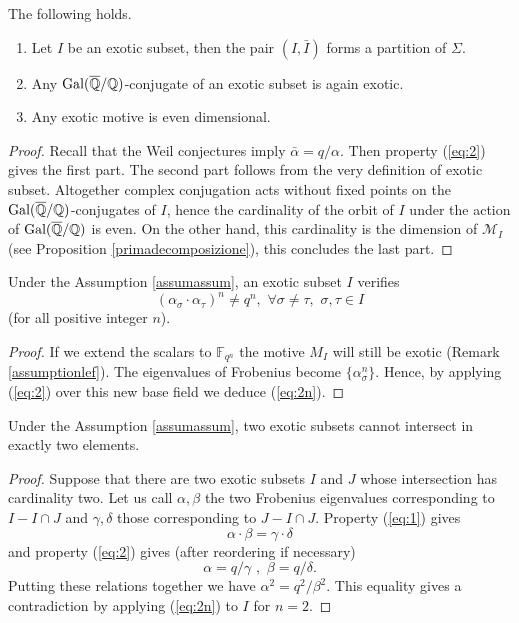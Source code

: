 \documentclass[11pt]{amsart}
\begin{document}
\begin{lemma}\label{lemmaeven} The following holds.
\begin{enumerate}
\item\label{partizione} Let $I$ be an exotic subset, then the pair $(I,\bar{I})$ forms a partition of $\Sigma$.
\item Any  $\textnormal{Gal}(\overline{\mathbb{Q}}/\mathbb{Q})$-conjugate of an exotic subset is again exotic.
\item Any exotic motive is even dimensional.
  \end{enumerate}
\end{lemma}
\begin{proof}
 Recall that the Weil conjectures imply $\bar{\alpha}=q/\alpha$. 
Then property (\ref{eq:2}) gives the first part. The second part follows from the very definition of exotic subset. 
Altogether complex conjugation acts without fixed points on  the $\textnormal{Gal}(\overline{\mathbb{Q}}/\mathbb{Q})$-conjugates of $I$, hence the cardinality of the orbit of $I$ under the action of   $\textnormal{Gal}(\overline{\mathbb{Q}}/\mathbb{Q})$ is even. On the other hand, this cardinality is the dimension of $\mathcal{M}_I$  (see  Proposition \ref{primadecomposizione}), this concludes the last part.
\end{proof}

\begin{lemma}
Under the Assumption \ref{assumassum}, an exotic subset $I$ verifies
\begin{equation} \label{eq:2n}
(\alpha_\sigma \cdot \alpha_\tau)^n \neq q^n, \, \, \forall \sigma \neq \tau, \,\, \sigma,\tau \in I
\end{equation} 
(for all positive integer $n$).
\end{lemma}
\begin{proof}
 If we extend the scalars to  $\mathbb{F}_{q^n}$  the motive $M_I$  will still be exotic (Remark \ref{assumptionlef}).  The eigenvalues of  Frobenius become $\{\alpha_\sigma^n\}$. Hence, by applying  (\ref{eq:2}) over this new base field we deduce (\ref{eq:2n}).
\end{proof}
\begin{lemma}\label{lemmanotwo}
Under the Assumption \ref{assumassum}, two exotic subsets cannot intersect in exactly two elements.
\end{lemma}
\begin{proof}
 Suppose that there are two exotic subsets  $I$ and $J$ whose intersection has cardinality two. Let us call $\alpha,\beta$ the two Frobenius eigenvalues corresponding to  $I-I\cap J$ and $\gamma,\delta$  those corresponding to  $J-I\cap J$.  Property (\ref{eq:1})  gives
 \[\alpha\cdot \beta=\gamma \cdot  \delta\]
and  property (\ref{eq:2}) gives (after reordering if necessary)
\[\alpha= q/ \gamma \,\, , \,\, \beta=  q/\delta.\]
Putting these relations together we have 
$\alpha^2 =q^2/\beta^2.$ This equality gives a contradiction by applying   (\ref{eq:2n})   to $I$ for $n=2$.
\end{proof}
\end{document}
